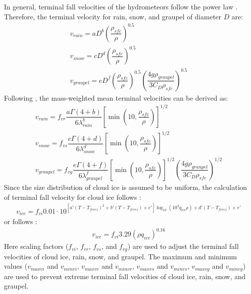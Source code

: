 \documentclass[letterpaper,titlepage,10pt]{article}
\numberwithin{equation}{section}
\begin{document}
In general, terminal fall velocities of the hydrometeors follow the power law \citep{lin1983bulk, pruppacher2010micr}. Therefore, the terminal velocity for rain, snow, and graupel of diameter $D$ are:
\begin{gather}
	v_{rain} = a D^b \left(\dfrac{\rho_{sfc}}{\rho} \right)^{0.5} \\
	v_{snow} = c D^d \left(\dfrac{\rho_{sfc}}{\rho} \right)^{0.5} \\
	v_{graupel} = e D^{f}  \left(\dfrac{\rho_{sfc}}{\rho} \right)^{0.5} \left(\dfrac{4 g \rho_{graupel}}{3 C_D \rho_{sfc}} \right)^{0.5}
\end{gather}
Following \citet{srivastava1967astu}, the mass-weighted mean terminal velocities can be derived as:
\begin{gather}
	v_{rain} = f_{vr} \dfrac{a \Gamma \left(4 + b \right)}{6 \lambda^b_{rain}} \left[\min \left(10, \dfrac{\rho_{sfc}}{\rho} \right) \right]^{1/2} \\
	v_{snow} = f_{vs} \dfrac{c \Gamma \left(4 + d \right)}{6 \lambda^d_{snow}} \left[\min \left(10, \dfrac{\rho_{sfc}}{\rho} \right) \right]^{1/2} \\
	v_{graupel} = f_{vg} \dfrac{e \Gamma \left(4 + f \right)}{6 \lambda^{f}_{graupel}} \left[\min \left(10, \dfrac{\rho_{sfc}}{\rho} \right) \right]^{1/2} \left(\dfrac{4 g \rho_{graupel}}{3 C_D \rho_{sfc}} \right)^{1/2} 
\end{gather}
Since the size distribution of cloud ice is assumed to be uniform, the calculation of terminal fall velocity for cloud ice follows \citet{deng2008cirr}:
\begin{gather}
	v_{ice} = f_{vi} 0.01 \cdot 10^{\left[a' \left(T - T_{freez} \right)^2 + b' \left(T - T_{freez} \right)+ c' \right] \log_{10} \left(10^3 q_{ice} \rho \right) + d' \left(T - T_{freez} \right) + e'}
\end{gather}
or follows \citet{heymsfield1990asch}:
\begin{gather}
	v_{ice} = f_{vi} 3.29 \left(\rho q_{ice} \right)^{0.16}
\end{gather}
Here scaling factors ($f_{vi}$, $f_{vr}$, $f_{vs}$, and $f_{vg}$) are used to adjust the terminal fall velocities of cloud ice, rain, snow, and graupel. The maximum and minimum values ($v_{maxvi}$ and $v_{minvi}$, $v_{maxvr}$ and $v_{minvr}$, $v_{maxvs}$ and $v_{minvs}$, $v_{maxvg}$ and $v_{minvg}$) are used to prevent extreme terminal fall velocities of cloud ice, rain, snow, and graupel. 

\end{document}
